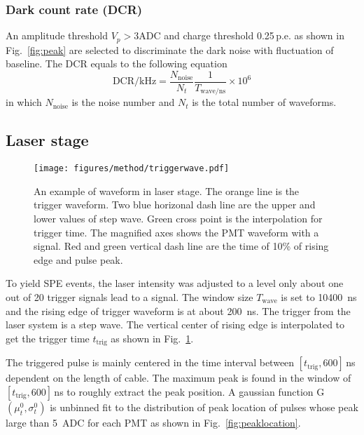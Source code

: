 \subsubsection{Dark count rate (DCR)}
An amplitude threshold $V_{p}>3\mathrm{ADC}$ and charge threshold 0.25\,p.e. as shown in Fig.~\ref{fig:peak} are selected to discriminate the dark noise with fluctuation of baseline. The DCR equals to the following equation
\begin{equation}
    \mathrm{DCR/kHz} = \frac{N_{\mathrm{noise}}}{N_{t}}\frac{1}{T_{\mathrm{wave}/\mathrm{ns}}}\times 10^{6}
\end{equation}
in which $N_{\mathrm{noise}}$ is the noise number and $N_{t}$ is the total number of waveforms.

\subsection{Laser stage}
\label{sec:laserstage}

\begin{figure}[!htbp]
    \centering
    \texttt{[image: figures/method/triggerwave.pdf]}
    \caption{An example of waveform in laser stage. The orange line is the trigger waveform. Two blue horizonal dash line are the upper and lower values of step wave. Green cross point is the interpolation for trigger time. The magnified axes shows the PMT waveform with a signal. Red and green vertical dash line are the time of 10\% of rising edge and pulse peak.}
    \label{fig:triggertime}
\end{figure}

To yield SPE events, the laser intensity was adjusted to a level only about one out of 20 trigger signals lead to a signal. The window size $T_{\mathrm{wave}}$ is set to \SI{10400}{ns} and the rising edge of trigger waveform is at about \SI{200}{ns}. The trigger from the laser system is a step wave. The vertical center of rising edge is interpolated to get the trigger time $t_{\mathrm{trig}}$ as shown in Fig.~\ref{fig:triggertime}.

The triggered pulse is mainly centered in the time interval between $[t_{\mathrm{trig}}, 600]$\,ns dependent on the length of cable. The maximum peak is found in the window of $[t_{\mathrm{trig}}, 600]$\,ns to roughly extract the peak position. A gaussian function G$(\mu_t^0,\sigma_t^0)$ is unbinned fit to the distribution of peak location of pulses whose peak large than \SI{5}{ADC} for each PMT as shown in Fig.~\ref{fig:peaklocation}.

